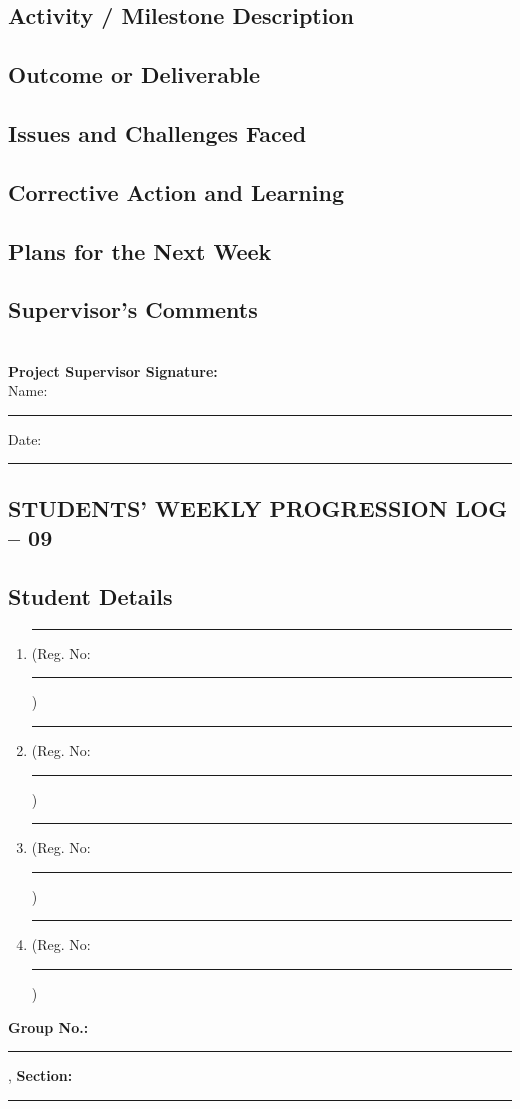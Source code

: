 \documentclass[a4paper]{article}
\begin{document}
				 
\subsection*{Activity / Milestone Description}
\framebox[\textwidth][c]{\rule{0pt}{4cm}}

\subsection*{Outcome or Deliverable}
\framebox[\textwidth][c]{\rule{0pt}{4cm}}


\subsection*{Issues and Challenges Faced}
\framebox[\textwidth][c]{\rule{0pt}{4cm}}


\subsection*{Corrective Action and Learning}
\framebox[\textwidth][c]{\rule{0pt}{4cm}}


\subsection*{Plans for the Next Week}
\framebox[\textwidth][c]{\rule{0pt}{4cm}}

\subsection*{Supervisor's Comments}
\framebox[\textwidth][c]{\rule{0pt}{4cm}}\\[2em]

\vfill
\textbf{Project Supervisor Signature:}\\[1em]
Name: \rule{6cm}{0.4pt} \hfill Date: \rule{4cm}{0.4pt}

\newpage
\begin{center}
\section*{STUDENTS' WEEKLY PROGRESSION LOG -- 09}
\end{center}

\subsection*{Student Details} 
\begin{enumerate}[itemsep=0em]
\item \rule{8cm}{0.4pt} (Reg. No:\rule{2cm}{0.4pt})
\item \rule{8cm}{0.4pt} (Reg. No:\rule{2cm}{0.4pt})
\item \rule{8cm}{0.4pt} (Reg. No:\rule{2cm}{0.4pt})
\item \rule{8cm}{0.4pt} (Reg. No:\rule{2cm}{0.4pt})
\end{enumerate}
\textbf{Group No.:} \rule{4cm}{0.4pt}, \textbf{Section:} \rule{3.5cm}{0.4pt}
\end{document}
